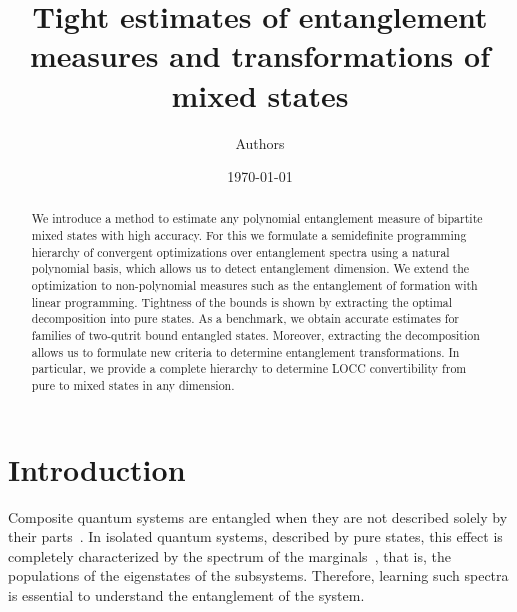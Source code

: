 \documentclass[aps,pra,twocolumn,showpacs,superscriptaddress,groupedaddress]{revtex4-2}
\begin{document}
\title{
Tight estimates of entanglement measures and transformations of mixed states
}

\author{Authors
}


\date{\today}
\begin{abstract}
We introduce a method to estimate any polynomial entanglement measure of bipartite mixed states with high accuracy. For this we formulate a semidefinite programming hierarchy of convergent optimizations over entanglement spectra using a natural polynomial basis, which allows us to detect entanglement dimension. We extend the optimization to  non-polynomial measures such as the entanglement of formation with linear programming. Tightness of the bounds is shown by extracting the optimal decomposition into pure states. As a benchmark, we obtain accurate estimates for families of two-qutrit bound entangled states. Moreover, extracting the decomposition allows us to formulate new criteria to determine entanglement transformations. In particular, we provide a complete hierarchy to determine LOCC convertibility from pure to mixed states in any dimension.

\end{abstract}

\maketitle
\section{Introduction}
Composite quantum systems are entangled when they are not described solely by their parts~\cite{epr}. In isolated quantum systems, described by pure states, this effect is completely characterized by the spectrum of the marginals~\cite{Nielsen1999MajLOCC}, that is, the populations of the eigenstates of the subsystems. Therefore, learning such spectra is essential to understand the entanglement of the system.
\end{document}
